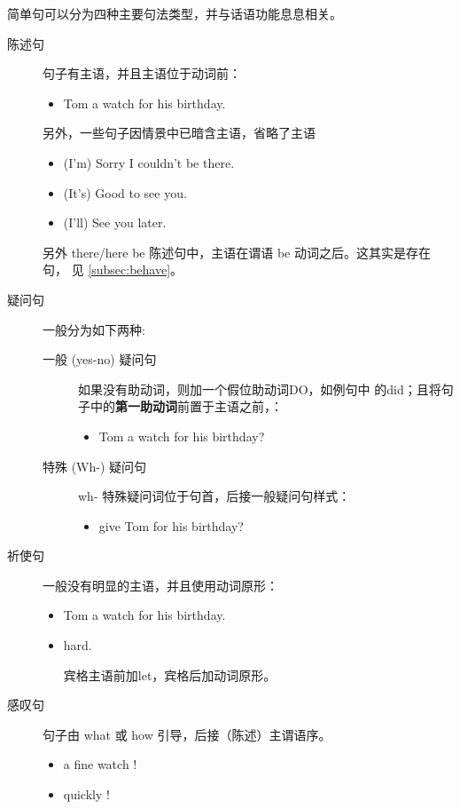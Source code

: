 简单句可以分为四种主要句法类型，并与话语功能息息相关。
\begin{description}
\item[陈述句] 句子有主语，并且主语位于动词前：
  \begin{itemize}
  \item {}  Tom a watch for his birthday.
  \end{itemize}

  另外，一些句子因情景中已暗含主语，省略了主语
  \begin{itemize}
  \item (I'm) Sorry I couldn't be there.

  \item (It's) Good to see you.
  \item (I'll) See you later.
  \end{itemize}

  另外 there/here be 陈述句中，主语在谓语 be 动词之后。这其实是存在句，
  见 \cref{subsec:behave}。

\item [疑问句] 一般分为如下两种:
  \begin{description}
  \item [一般 (yes-no) 疑问句] 如果没有助动词，则加一个假位助动词DO，如例句中
    的did；且将句子中的\textbf{第一助动词}前置于主语之前，：
    \begin{itemize}
    \item {}   Tom a watch for his birthday?
    \end{itemize}

  \item [特殊 (Wh-) 疑问句] wh- 特殊疑问词位于句首，后接一般疑问句样式：
    \begin{itemize}
    \item {}   give Tom for his birthday?
    \end{itemize}
  \end{description}

\item[祈使句] 一般没有明显的主语，并且使用动词原形：
  \begin{itemize}
  \item {} Tom a watch for his birthday.

  \item {}  hard.

    宾格主语前加let，宾格后加动词原形。
  \end{itemize}


\item[感叹句] 句子由 what 或 how 引导，后接（陈述）主谓语序。
  \begin{itemize}
  \item {} a fine watch !

  \item {} quickly !
  \end{itemize}
\end{description}


